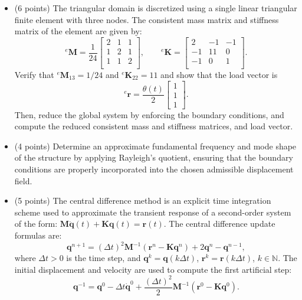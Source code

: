 \documentclass[12pt]{article}
\begin{document}
\begin{itemize}
	\item[(b)] (6 points) The triangular domain is discretized using a single linear triangular finite element with three nodes. The consistent mass matrix and stiffness matrix of the element are given by:
	      \[
		      {}^e\mathbf M = \frac{1}{24} \begin{bmatrix}
			      2 & 1 & 1 \\
			      1 & 2 & 1 \\
			      1 & 1 & 2 \\
		      \end{bmatrix}, \qquad
		      {}^e\mathbf K = \begin{bmatrix}
			      2  & -1 & -1 \\
			      -1 & 11 & 0  \\
			      -1 & 0  & 1  \\
		      \end{bmatrix}.
	      \]
	      Verify that ${}^e\mathbf M_{13}=1/24$ and ${}^e\mathbf K_{22}=11$ and show that the load vector is
	      $${}^e\mathbf r=   \frac{\theta(t)}{2}\begin{bmatrix}
			      1 \\
			      1 \\
			      1
		      \end{bmatrix}.$$
	      Then, reduce the global system by enforcing the boundary conditions, and compute the reduced consistent mass and stiffness matrices, and load vector.
	\item[(c)] (4 points) Determine an approximate fundamental frequency and mode shape of the structure by applying Rayleigh's quotient, ensuring that the boundary conditions are properly incorporated into the chosen admissible displacement field.
	\item[(d)]  (5 points) The central difference method is an explicit time integration scheme used to approximate the transient response of a second-order system of the form: $\mathbf{M} \ddot{\mathbf{q}}(t) + \mathbf{K} \mathbf{q}(t) = \mathbf{r}(t)$. The central difference update formulas are:
	      \[
		      \mathbf{q}^{n+1} = (\Delta t)^2 \mathbf{M}^{-1} \left( \mathbf{r}^n - \mathbf{K} \mathbf{q}^n \right) + 2\mathbf{q}^n - \mathbf{q}^{n-1},
	      \]
	      where \( \Delta t>0 \) is the time step, and $\mathbf{q}^{k}=\mathbf{q}(k\Delta t)$, $\mathbf{r}^{k}=\mathbf{r}(k\Delta t)$, $k\in\mathbb N$. The initial displacement and velocity are used to compute the first artificial step:
	      \[
		      \mathbf{q}^{-1} = \mathbf{q}^0 - \Delta t \dot{\mathbf{q}}^0 + \frac{(\Delta t)^2}{2} \mathbf{M}^{-1} \left( \mathbf{r}^0 - \mathbf{K} \mathbf{q}^0 \right).
\]
\end{itemize}
\end{document}
